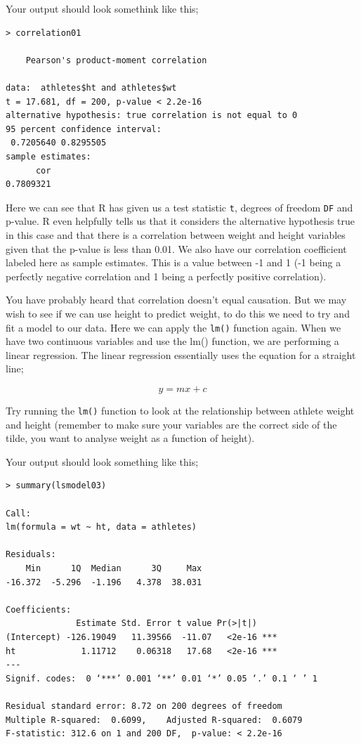 \documentclass[
]{book}
\begin{document}
Your output should look somethink like this;

\begin{verbatim}
> correlation01

    Pearson's product-moment correlation

data:  athletes$ht and athletes$wt
t = 17.681, df = 200, p-value < 2.2e-16
alternative hypothesis: true correlation is not equal to 0
95 percent confidence interval:
 0.7205640 0.8295505
sample estimates:
      cor 
0.7809321 
\end{verbatim}

Here we can see that R has given us a test statistic \texttt{t}, degrees of freedom \texttt{DF} and p-value. R even helpfully tells us that it considers the alternative hypothesis true in this case and that there is a correlation between weight and height variables given that the p-value is less than 0.01. We also have our correlation coefficient labeled here as sample estimates. This is a value between -1 and 1 (-1 being a perfectly negative correlation and 1 being a perfectly positive correlation).

You have probably heard that correlation doesn't equal causation. But we may wish to see if we can use height to predict weight, to do this we need to try and fit a model to our data. Here we can apply the \texttt{lm()} function again. When we have two continuous variables and use the lm() function, we are performing a linear regression. The linear regression essentially uses the equation for a straight line;

\[
y = mx+c
\]

Try running the \texttt{lm()} function to look at the relationship between athlete weight and height (remember to make sure your variables are the correct side of the tilde, you want to analyse weight as a function of height).

Your output should look something like this;

\begin{verbatim}
> summary(lsmodel03)

Call:
lm(formula = wt ~ ht, data = athletes)

Residuals:
    Min      1Q  Median      3Q     Max 
-16.372  -5.296  -1.196   4.378  38.031 

Coefficients:
              Estimate Std. Error t value Pr(>|t|)    
(Intercept) -126.19049   11.39566  -11.07   <2e-16 ***
ht             1.11712    0.06318   17.68   <2e-16 ***
---
Signif. codes:  0 ‘***’ 0.001 ‘**’ 0.01 ‘*’ 0.05 ‘.’ 0.1 ‘ ’ 1

Residual standard error: 8.72 on 200 degrees of freedom
Multiple R-squared:  0.6099,    Adjusted R-squared:  0.6079 
F-statistic: 312.6 on 1 and 200 DF,  p-value: < 2.2e-16
\end{verbatim}
\end{document}

